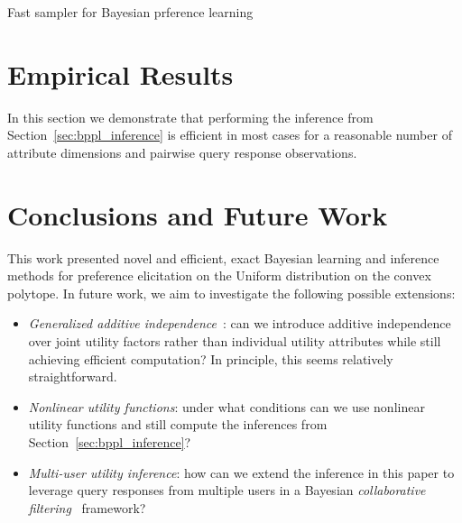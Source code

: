 \documentclass[letterpaper]{article}
\begin{document}
\begin{algorithm}[h]
  \begin{algorithmic}
    \STATE { each path to leaves specifies a disjoint interval $[$LB, UB$]$]}
      \ELSE
      \ENDIF
      \ENDIF 
      \ENDFOR
      \ENDFOR
  \end{algorithmic}
  \caption{Fast sampler for Bayesian prference learning }
\end{algorithm}






\section{Empirical Results}


In this section we demonstrate that performing the inference from
Section~\ref{sec:bppl_inference} is efficient in most cases for
a reasonable number of attribute dimensions and pairwise query
response observations.





\section{Conclusions and Future Work}

This work presented novel and efficient, exact Bayesian learning and
inference methods for preference elicitation on the Uniform
distribution on the convex polytope.  In future work, we aim to
investigate the following possible extensions:
\begin{itemize}
\item {\it Generalized additive
independence}~\cite{keeney_raiffa76,bacchus_grove}: can we introduce additive
independence over joint utility factors rather than individual utility 
attributes while still achieving efficient computation?  In principle,
this seems relatively straightforward.
\item {\it Nonlinear utility functions}: under what conditions can we
use nonlinear utility functions and still compute the inferences from
Section~\ref{sec:bppl_inference}?
\item {\it Multi-user utility inference}: how can we extend the
inference in this paper to leverage query responses from multiple
users in a Bayesian \emph{collaborative filtering}~\cite{collab_filtering} 
framework?
\end{itemize}

%



\end{document}
